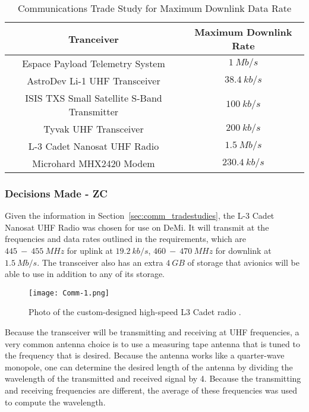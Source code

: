 \documentclass[12pt]{article}
\begin{document}
\begin{table}[ht]
\caption{Communications Trade Study for Maximum Downlink Data Rate}
\begin{center}
    \begin{tabular}{| c | c |} \hline
    	Tranceiver & Maximum Downlink Rate \\ \hline \hline
Espace Payload Telemetry System & $1\ Mb/s$ \\
AstroDev Li-1 UHF Transceiver & $38.4\ kb/s$ \\
ISIS TXS Small Satellite  S-Band Transmitter & $100\ kb/s$ \\
Tyvak UHF Transceiver & $200\ kb/s$ \\
L-3 Cadet Nanosat UHF Radio & $1.5\ Mb/s$ \\
Microhard MHX2420 Modem & $230.4\ kb/s$ \\ \hline 
    \end{tabular}
\end{center}
\label{table:comm_transceivers}
\end{table}

			\subsubsection{Decisions Made - ZC}

Given the information in Section~\ref{sec:comm_tradestudies}, the L-3 Cadet Nanosat UHF Radio was chosen for use on DeMi. It will transmit at the frequencies and data rates outlined in the requirements, which are $445\ -\ 455\ MHz$ for uplink at $19.2\ kb/s$, $460\ -\ 470\ MHz$ for downlink at $1.5\ Mb/s$. The transceiver also has an extra $4\ GB$ of storage that avionics will be able to use in addition to any of its storage. 

\begin{figure}[ht]
\centering
  \texttt{[image: Comm-1.png]}
\caption{Photo of the custom-designed high-speed L3 Cadet radio \cite{DICE}.}
\label{fig:comm_Cadet}
\end{figure}

Because the transceiver will be transmitting and receiving at UHF frequencies, a very common antenna choice is to use a measuring tape antenna that is tuned to the frequency that is desired. Because the antenna works like a quarter-wave monopole, one can determine the desired length of the antenna by dividing the wavelength of the transmitted and received signal by 4. Because the transmitting and receiving frequencies are different, the average of these frequencies was used to compute the wavelength. 
\end{document}
